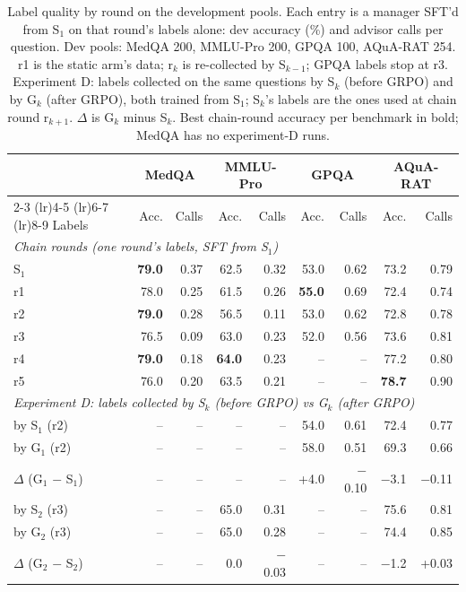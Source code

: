 \begin{table}[t]
\centering
\caption{Label quality by round on the development pools. Each entry is a manager SFT'd from S$_1$ on that round's labels alone: dev accuracy (\%) and advisor calls per question. Dev pools: MedQA 200, MMLU-Pro 200, GPQA 100, AQuA-RAT 254. r1 is the static arm's data; r$_k$ is re-collected by S$_{k-1}$; GPQA labels stop at r3. Experiment D: labels collected on the same questions by S$_k$ (before GRPO) and by G$_k$ (after GRPO), both trained from S$_1$; S$_k$'s labels are the ones used at chain round r$_{k+1}$. $\Delta$ is G$_k$ minus S$_k$. Best chain-round accuracy per benchmark in bold; MedQA has no experiment-D runs.}
\label{tab:label_quality}
\small
\setlength{\tabcolsep}{5pt}
\begin{tabular}{l rr rr rr rr}
\toprule
 & \multicolumn{2}{c}{MedQA} & \multicolumn{2}{c}{MMLU-Pro} & \multicolumn{2}{c}{GPQA} & \multicolumn{2}{c}{AQuA-RAT} \\
\cmidrule(lr){2-3} \cmidrule(lr){4-5} \cmidrule(lr){6-7} \cmidrule(lr){8-9}
Labels & Acc. & Calls & Acc. & Calls & Acc. & Calls & Acc. & Calls \\
\midrule
\multicolumn{9}{l}{\textit{Chain rounds (one round's labels, SFT from S$_1$)}} \\
S$_1$ & \textbf{79.0} & 0.37 & 62.5 & 0.32 & 53.0 & 0.62 & 73.2 & 0.79 \\
r1 & 78.0 & 0.25 & 61.5 & 0.26 & \textbf{55.0} & 0.69 & 72.4 & 0.74 \\
r2 & \textbf{79.0} & 0.28 & 56.5 & 0.11 & 53.0 & 0.62 & 72.8 & 0.78 \\
r3 & 76.5 & 0.09 & 63.0 & 0.23 & 52.0 & 0.56 & 73.6 & 0.81 \\
r4 & \textbf{79.0} & 0.18 & \textbf{64.0} & 0.23 & -- & -- & 77.2 & 0.80 \\
r5 & 76.0 & 0.20 & 63.5 & 0.21 & -- & -- & \textbf{78.7} & 0.90 \\
\midrule
\multicolumn{9}{l}{\textit{Experiment D: labels collected by S$_k$ (before GRPO) vs G$_k$ (after GRPO)}} \\
by S$_1$ (r2) & -- & -- & -- & -- & 54.0 & 0.61 & 72.4 & 0.77 \\
by G$_1$ (r2) & -- & -- & -- & -- & 58.0 & 0.51 & 69.3 & 0.66 \\
\quad $\Delta$ (G$_1$ $-$ S$_1$) & -- & -- & -- & -- & +4.0 & $-$0.10 & $-$3.1 & $-$0.11 \\
by S$_2$ (r3) & -- & -- & 65.0 & 0.31 & -- & -- & 75.6 & 0.81 \\
by G$_2$ (r3) & -- & -- & 65.0 & 0.28 & -- & -- & 74.4 & 0.85 \\
\quad $\Delta$ (G$_2$ $-$ S$_2$) & -- & -- & 0.0 & $-$0.03 & -- & -- & $-$1.2 & +0.03 \\
\bottomrule
\end{tabular}
\end{table}
